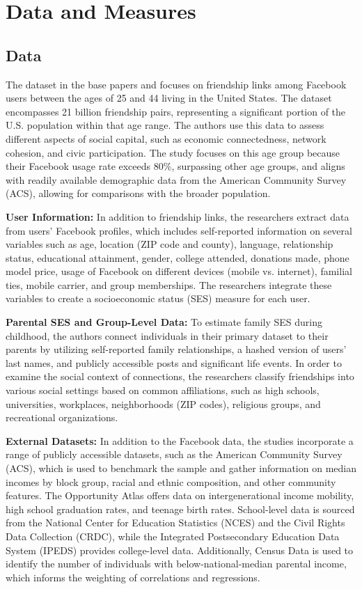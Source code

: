 \documentclass[9 pt]{article} %
\begin{document}
\section{Data and Measures}
\subsection{Data}
The dataset in the base papers \cite{chetty2022social} and \cite{chetty2022social2} focuses on friendship links among Facebook users between the ages of 25 and 44 living in the United States. The dataset encompasses 21 billion friendship pairs, representing a significant portion of the U.S. population within that age range. The authors use this data to assess different aspects of social capital, such as economic connectedness, network cohesion, and civic participation. The study focuses on this age group because their Facebook usage rate exceeds 80\%, surpassing other age groups, and aligns with readily available demographic data from the American Community Survey (ACS), allowing for comparisons with the broader population.

\textbf{User Information:} In addition to friendship links, the researchers extract data from users' Facebook profiles, which includes self-reported information on several variables such as age, location (ZIP code and county), language, relationship status, educational attainment, gender, college attended, donations made, phone model price, usage of Facebook on different devices (mobile vs. internet), familial ties, mobile carrier, and group memberships. The researchers integrate these variables to create a socioeconomic status (SES) measure for each user.

\textbf{Parental SES and Group-Level Data:} To estimate family SES during childhood, the authors connect individuals in their primary dataset to their parents by utilizing self-reported family relationships, a hashed version of users' last names, and publicly accessible posts and significant life events. In order to examine the social context of connections, the researchers classify friendships into various social settings based on common affiliations, such as high schools, universities, workplaces, neighborhoods (ZIP codes), religious groups, and recreational organizations.

\textbf{External Datasets:} In addition to the Facebook data, the studies incorporate a range of publicly accessible datasets, such as the American Community Survey (ACS), which is used to benchmark the sample and gather information on median incomes by block group, racial and ethnic composition, and other community features. The Opportunity Atlas offers data on intergenerational income mobility, high school graduation rates, and teenage birth rates. School-level data is sourced from the National Center for Education Statistics (NCES) and the Civil Rights Data Collection (CRDC), while the Integrated Postsecondary Education Data System (IPEDS) provides college-level data. Additionally, Census Data is used to identify the number of individuals with below-national-median parental income, which informs the weighting of correlations and regressions. 
\end{document}
